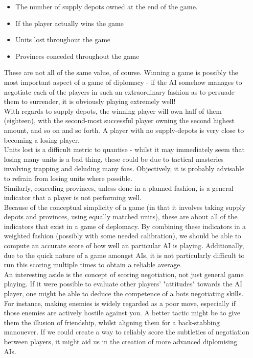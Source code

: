 \documentclass[12pt]{article}
\begin{document}
\begin{itemize}
\item The number of supply depots owned at the end of the game.
\item If the player actually wins the game
\item Units lost throughout the game
\item Provinces conceded throughout the game
\end{itemize}

These are not all of the same value, of course. Winning a game is possibly the most important aspect of a game of diplomacy - if the AI somehow manages to negotiate each of the players in such an extraordinary fashion as to persuade them to surrender, it is obviously playing extremely well! 
\\
With regards to supply depots, the winning player will own half of them (eighteen), with the second-most successful player owning the second highest amount, and so on and so forth. A player with no supply-depots is very close to becoming a losing player.
\\
Units lost is a difficult metric to quantise - whilst it may immediately seem that losing many units is a bad thing, these could be due to tactical masteries involving trapping and deluding many foes. Objectively, it is probably advisable to refrain from losing units where possible.
\\
Similarly, conceding provinces, unless done in a planned fashion, is a general indicator that a player is not performing well.
\\
Because of the conceptual simplicity of a game (in that it involves taking supply depots and provinces, using equally matched units), these are about all of the indicators that exist in a game of deplomacy.  By combining these indicators in a weighted fashion (possibly with some needed calibration), we should be able to compute an accurate score of how well an particular AI is playing. Additionally, due to the quick nature of a game amongst AIs, it is not particularly difficult to run this scoring multiple times to obtain a reliable average.
\\
An interesting aside is the concept of scoring negotiation, not just general game playing. If it were possible to evaluate other players' "attitudes" towards the AI player, one might be able to deduce the competence of a bots negotiating skills. For instance, making enemies is widely regarded as a poor move, especially if those enemies are actively hostile against you. A better tactic might be to give them the illusion of friendship, whilst aligning them for a back-stabbing manouever. If we could create a way to reliably score the subtleties of negotiation between players, it might aid us in the creation of more advanced diplomising AIs.
\end{document}
